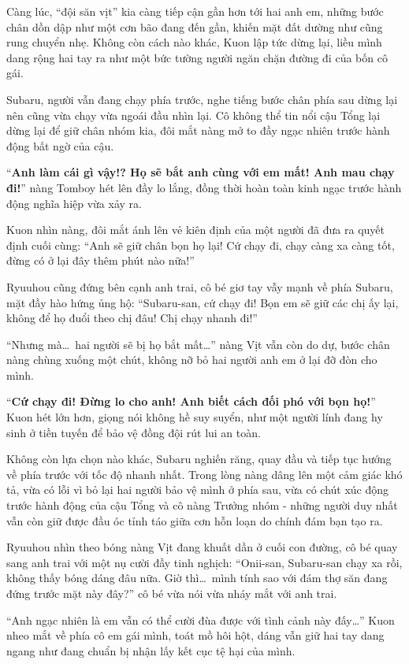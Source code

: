 \documentclass[../main.tex]{subfiles}
\begin{document}
Càng lúc, ``đội săn vịt'' kia càng tiếp cận gần hơn tới hai anh em, những bước chân dồn dập như một cơn bão đang đến gần, khiến mặt đất dường như cũng rung chuyển nhẹ. Không còn cách nào khác, Kuon lập tức dừng lại, liều mình dang rộng hai tay ra như một bức tường người ngăn chặn đường đi của bốn cô gái.

Subaru, người vẫn đang chạy phía trước, nghe tiếng bước chân phía sau dừng lại nên cũng vừa chạy vừa ngoái đầu nhìn lại. Cô không thể tin nổi cậu Tổng lại dừng lại để giữ chân nhóm kia, đôi mắt nàng mở to đầy ngạc nhiên trước hành động bất ngờ của cậu.

``\textbf{Anh làm cái gì vậy!? Họ sẽ bắt anh cùng với em mất! Anh mau chạy đi!}'' nàng Tomboy hét lên đầy lo lắng, đồng thời hoàn toàn kinh ngạc trước hành động nghĩa hiệp vừa xảy ra.

Kuon nhìn nàng, đôi mắt ánh lên vẻ kiên định của một người đã đưa ra quyết định cuối cùng: ``Anh sẽ giữ chân bọn họ lại! Cứ chạy đi, chạy càng xa càng tốt, đừng có ở lại đây thêm phút nào nữa!''

Ryuuhou cũng đứng bên cạnh anh trai, cô bé giơ tay vẫy mạnh về phía Subaru, mặt đầy hào hứng ủng hộ: ``Subaru-san, cứ chạy đi! Bọn em sẽ giữ các chị ấy lại, không để họ đuổi theo chị đâu! Chị chạy nhanh đi!''

``Nhưng mà\dots\ hai người sẽ bị họ bắt mất\dots'' nàng Vịt vẫn còn do dự, bước chân nàng chùng xuống một chút, không nỡ bỏ hai người anh em ở lại đỡ đòn cho mình.

``\textbf{Cứ chạy đi! Đừng lo cho anh! Anh biết cách đối phó với bọn họ!}'' Kuon hét lớn hơn, giọng nói không hề suy suyển, như một người lính đang hy sinh ở tiền tuyến để bảo vệ đồng đội rút lui an toàn.

Không còn lựa chọn nào khác, Subaru nghiến răng, quay đầu và tiếp tục hướng về phía trước với tốc độ nhanh nhất. Trong lòng nàng dâng lên một cảm giác khó tả, vừa có lỗi vì bỏ lại hai người bảo vệ mình ở phía sau, vừa có chút xúc động trước hành động của cậu Tổng và cô nàng Trưởng nhóm - những người duy nhất vẫn còn giữ được đầu óc tỉnh táo giữa cơn hỗn loạn do chính đám bạn tạo ra.

Ryuuhou nhìn theo bóng nàng Vịt đang khuất dần ở cuối con đường, cô bé quay sang anh trai với một nụ cười đầy tinh nghịch: ``Onii-san, Subaru-san chạy xa rồi, không thấy bóng dáng đâu nữa. Giờ thì\dots\ mình tính sao với đám thợ săn đang đứng trước mặt này đây?'' cô bé vừa nói vừa nháy mắt với anh trai.

``Anh ngạc nhiên là em vẫn có thể cười đùa được với tình cảnh này đấy\dots'' Kuon nheo mắt về phía cô em gái mình, toát mồ hôi hột, dáng vẫn giữ hai tay dang ngang như đang chuẩn bị nhận lấy kết cục tệ hại của mình.
\end{document}
